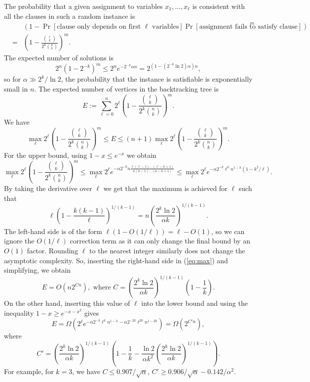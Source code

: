 \documentclass[11pt]{article}
\DeclareMathOperator{\poly}{poly}
\newcommand{\be}{\begin{equation}}
\newcommand{\ee}{\end{equation}}
\newcommand{\beas}{\begin{eqnarray*}}
\newcommand{\eeas}{\end{eqnarray*}}
\begin{document}
The probability that a given assignment to variables $x_1,\dots,x_\ell$ is consistent with all the clauses in such a random instance is
%
\beas && \left(1 - \Pr[\text{clause only depends on first $\ell$ variables}] \Pr[\text{assignment fails to satisfy clause}] \right)^m \\
&=& \left(1 - \frac{\binom{\ell}{k}}{2^k \binom{n}{k}}\right)^m.
\eeas
%
The expected number of solutions is
%
\[ 2^n (1- 2^{-k})^m \le 2^n e^{-2^{-k}\alpha n} = 2^{(1-(2^{-k} \ln 2)\alpha)n}, \]
%
so for $\alpha \gg 2^k/\ln 2$, the probability that the instance is satisfiable is exponentially small in $n$. The expected number of vertices in the backtracking tree is
%
\[ E := \sum_{\ell=0}^n 2^\ell \left(1 - \frac{\binom{\ell}{k}}{2^k \binom{n}{k}} \right)^m. \]
%
We have
%
\[ \max_{\ell} 2^\ell  \left(1 - \frac{\binom{\ell}{k}}{2^k \binom{n}{k}} \right)^m \le E \le (n+1) \max_{\ell} 2^\ell  \left(1 - \frac{\binom{\ell}{k}}{2^k \binom{n}{k}}\right)^m. \]
%
For the upper bound, using $1-x \le e^{-x}$ we obtain
%
\be \label{eq:max} \max_{\ell} 2^\ell \left(1 - \frac{\binom{\ell}{k}}{2^k \binom{n}{k}} \right)^m \le \max_{\ell} 2^\ell e^{-\alpha 2^{-k} n \frac{\ell(\ell-1)\dots(\ell-k+1)}{n(n-1)\dots(n-k+1)} } \le \max_{\ell} 2^\ell e^{-\alpha 2^{-k} \ell^k n^{1-k} (1-k^2/\ell) }. \ee
%
By taking the derivative over $\ell$ we get that the maximum is achieved for $\ell$ such that
%
\[ \ell\left(1 - \frac{k(k-1)}{\ell} \right)^{1/(k-1)} = n \left(\frac{2^k \ln 2}{\alpha k}\right)^{1/(k-1)}. \]
%
The left-hand side is of the form $\ell(1 - O(1/\ell)) = \ell - O(1)$, so we can ignore the $O(1/\ell)$ correction term as it can only change the final bound by an $O(1)$ factor. Rounding $\ell$ to the nearest integer similarly does not change the asymptotic complexity. So, inserting the right-hand side in (\ref{eq:max}) and simplifying, we obtain
%
%
%
%
\[ E = O(n 2^{Cn}), \text{ where } C = \left( \frac{2^k \ln 2}{\alpha k} \right)^{1/(k-1)} \left(1 - \frac{1}{k} \right). \]
%
On the other hand, inserting this value of $\ell$ into the lower bound and using the inequality $1-x \ge e^{-x-x^2}$ gives
%
\[ E = \Omega(2^\ell e^{-\alpha 2^{-k} \ell^k n^{1-k} - \alpha 2^{-2k} \ell^{2k} n^{1-2k}} ) = \Omega(2^{C'n}), \]
%
where
%
\[ C' = \left( \frac{2^k \ln 2}{\alpha k} \right)^{1/(k-1)} \left(1 - \frac{1}{k} - \frac{\ln 2}{\alpha k^2} \left( \frac{2^k \ln 2}{\alpha k} \right)^{1/(k-1)} \right). \]
%
For example, for $k = 3$, we have $C \le 0.907/\sqrt{\alpha}$, $C' \ge 0.906/\sqrt{\alpha} - 0.142/\alpha^2$. %




\end{document}
